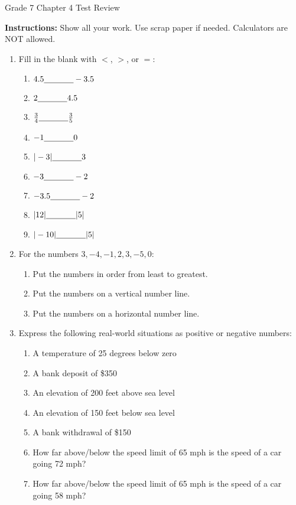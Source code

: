 \documentclass[12pt]{article}
\begin{document}
\centerline{\Large Grade 7 Chapter 4 Test Review}
\vspace{0.5in}

\textbf{Instructions:} Show all your work. Use scrap paper if needed. Calculators are NOT allowed.

\begin{enumerate}
    \item Fill in the blank with $<$, $>$, or $=$:
    \begin{enumerate}
        \item $4.5 \underline{\hspace{0.5in}} -3.5$
        \item $2 \underline{\hspace{0.5in}} 4.5$
        \item $\frac{3}{4} \underline{\hspace{0.5in}} \frac{3}{5}$
        \item $-1 \underline{\hspace{0.5in}} 0$
        \item $|-3| \underline{\hspace{0.5in}} 3$
        \item $-3 \underline{\hspace{0.5in}} -2$
        \item $-3.5 \underline{\hspace{0.5in}} -2$
        \item $|12| \underline{\hspace{0.5in}} |5|$
        \item $|-10| \underline{\hspace{0.5in}} |5|$
    \end{enumerate}
    \item For the numbers $3, -4, -1, 2, 3, -5, 0$:
    \begin{enumerate}
        \item Put the numbers in order from least to greatest.
        \item Put the numbers on a vertical number line.
        \item Put the numbers on a horizontal number line.
    \end{enumerate}
    \item Express the following real-world situations as positive or negative numbers:
    \begin{enumerate}
        \item A temperature of 25 degrees below zero
        \item A bank deposit of \$350
        \item An elevation of 200 feet above sea level
        \item An elevation of 150 feet below sea level
        \item A bank withdrawal of \$150
        \item How far above/below the speed limit of 65 mph is the speed of a car going 72 mph?
        \item How far above/below the speed limit of 65 mph is the speed of a car going 58 mph?
    \end{enumerate}

\end{enumerate}
\end{document}
